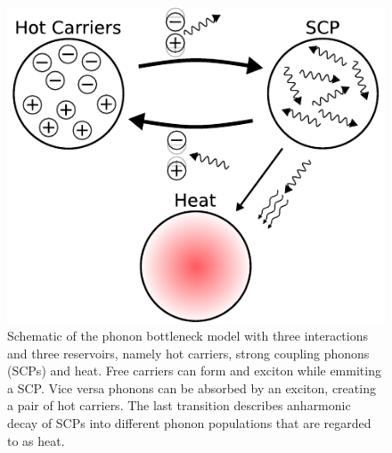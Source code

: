 \begin{figure}[!t]
	\begin{minipage}{0.5\columnwidth}
		\includegraphics[width=\columnwidth]{figs/phonon_bottleneck.pdf}
	\end{minipage}
	\hspace{0.04\columnwidth}
	\begin{minipage}{0.45\columnwidth}
		\caption{Schematic of the phonon bottleneck model with three interactions and three reservoirs, namely hot carriers, strong coupling phonons (SCPs) and heat. Free carriers can form and exciton while emmiting a SCP. Vice versa phonons can be absorbed by an exciton, creating a pair of hot carriers. The last transition describes anharmonic decay of SCPs into different phonon populations that are regarded to as heat.}
		\label{fig:model}
	\end{minipage}
\end{figure}


